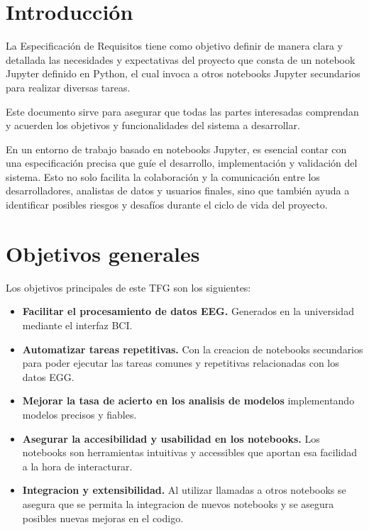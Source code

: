 
\section{Introducción}

La Especificación de Requisitos tiene como objetivo definir de manera clara y detallada las necesidades y expectativas del proyecto que consta de un notebook Jupyter definido en Python, el cual invoca a otros notebooks Jupyter secundarios para realizar diversas tareas. 

Este documento sirve para asegurar que todas las partes interesadas comprendan y acuerden los objetivos y funcionalidades del sistema a desarrollar.

En un entorno de trabajo basado en notebooks Jupyter, es esencial contar con una especificación precisa que guíe el desarrollo, implementación y validación del sistema. Esto no solo facilita la colaboración y la comunicación entre los desarrolladores, analistas de datos y usuarios finales, sino que también ayuda a identificar posibles riesgos y desafíos durante el ciclo de vida del proyecto.


\section{Objetivos generales}

Los objetivos principales de este TFG son los siguientes:

\begin{itemize}
\tightlist
\item
	\textbf{Facilitar el procesamiento de datos EEG.} Generados en la universidad mediante el interfaz BCI.  	
\item
 	\textbf{Automatizar tareas repetitivas.} Con la creacion de notebooks secundarios para poder ejecutar las tareas comunes y repetitivas relacionadas con los datos EGG. 
\item
	\textbf{Mejorar la tasa de acierto en los analisis de modelos} implementando modelos precisos y fiables. 
\item
	\textbf{Asegurar la accesibilidad y usabilidad en los notebooks.} Los notebooks son herramientas intuitivas y accessibles que aportan esa facilidad a la hora de interacturar.
\item
	\textbf{Integracion y extensibilidad.} Al utilizar llamadas a otros notebooks se asegura que se permita la integracion de nuevos notebooks y se asegura posibles nuevas mejoras en el codigo.
		
\end{itemize}



